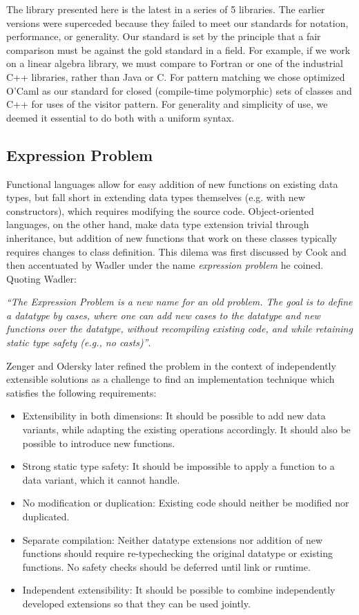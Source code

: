 \documentclass[preprint]{sigplanconf}
\begin{document}
The library presented here is the latest in a series of 5 libraries. The earlier 
versions were superceded because they failed to meet our standards for notation, 
performance, or generality. Our standard is set by the principle that a fair 
comparison must be against the gold standard in a field. For example, if we work 
on a linear algebra library, we must compare to Fortran or one of the industrial 
C++ libraries, rather than Java or C. For pattern matching we chose optimized 
O'Caml as our standard for closed (compile-time polymorphic) sets of classes and 
C++ for uses of the visitor pattern. For generality and simplicity of use, we 
deemed it essential to do both with a uniform syntax.

\subsection{Expression Problem}
\label{sec:exp}

Functional languages allow for easy addition of new functions on existing data 
types, but fall short in extending data types themselves (e.g. with new constructors), 
which requires modifying the source code. Object-oriented languages, on the 
other hand, make data type extension trivial through inheritance, but addition 
of new functions that work on these classes typically requires changes to class 
definition. This dilema was first discussed by Cook\cite{Cook90} and then 
accentuated by Wadler\cite{exprproblem} under the name \emph{expression problem} 
he coined. Quoting Wadler:

\emph{``The Expression Problem is a new name for an old problem. The goal is
to define a datatype by cases, where one can add new cases to the
datatype and new functions over the datatype, without recompiling
existing code, and while retaining static type safety (e.g., no
casts)''}.

Zenger and Odersky later refined the problem in the context of independently 
extensible solutions\cite{fool12} as a challenge to find an implementation 
technique which satisfies the following requirements:

\begin{itemize}
\item Extensibility in both dimensions: It should be possible to add new data 
      variants, while adapting the existing operations accordingly. It should 
      also be possible to introduce new functions.
\item Strong static type safety: It should be impossible to apply a function to 
      a data variant, which it cannot handle.
\item No modification or duplication: Existing code should neither be modified 
      nor duplicated.
\item Separate compilation: Neither datatype extensions nor addition of new 
      functions should require re-typechecking the original datatype or 
      existing functions. No safety checks should be deferred until link or 
      runtime.
\item Independent extensibility: It should be possible to combine independently 
      developed extensions so that they can be used jointly.
\end{itemize}
\end{document}
